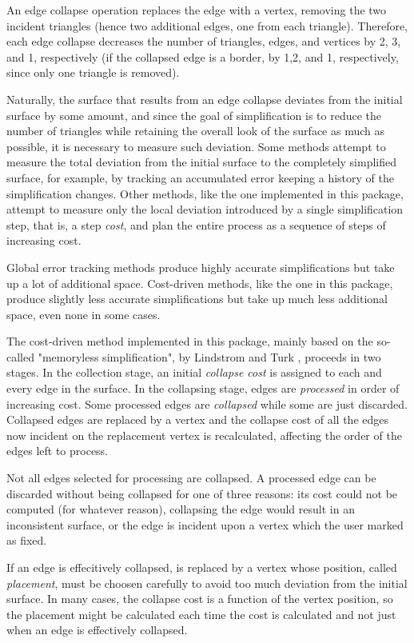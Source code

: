 An edge collapse operation replaces the edge with a vertex, removing the two incident triangles (hence two additional edges, one from each triangle). Therefore, each edge collapse decreases the number of triangles, edges, and vertices by 2, 3, and 1, respectively (if the collapsed edge is a border, by 1,2, and 1, respectively, since only one triangle is removed).

Naturally, the surface that results from an edge collapse deviates from the initial surface by some amount, and since the goal of simplification is to reduce the number of triangles while retaining the overall look of the surface as much as possible, it is necessary to measure such deviation. Some methods attempt to measure the total deviation from the initial surface to the completely simplified surface, for example, by tracking an accumulated error keeping a history of the simplification changes. Other methods, like the one implemented in this package, attempt to measure only the local deviation introduced by a single simplification step, that is, a step {\em cost}, and plan the entire process as a sequence of steps of increasing cost. 

Global error tracking methods produce highly accurate simplifications but take up a lot of additional space. Cost-driven methods, like the one in this package, produce slightly less accurate simplifications but take up much less additional space, even none in some cases.

The cost-driven method implemented in this package, mainly based on the so-called "memoryless simplification", by Lindstrom and Turk \cite{cgal:lt-fmeps-98,cgal:lt-ems-99}, proceeds in two stages. In the collection stage, an initial {\em collapse cost} is assigned to each and every edge in the surface. In the collapsing stage, edges are {\em processed} in order of increasing cost. Some processed edges are {\em collapsed} while some are just discarded. Collapsed edges are replaced by a vertex and the collapse cost of all the edges now incident on the replacement vertex is recalculated, affecting the order of the edges left to process.

Not all edges selected for processing are collapsed. A processed edge can be discarded without being collapsed for one of three reasons: its cost could not be computed (for whatever reason), collapsing the edge would result in an inconsistent surface, or the edge is incident upon a vertex which the user marked as fixed.

If an edge is effecitively collapsed, is replaced by a vertex whose position, called {\em placement}, must be choosen carefully to avoid too much deviation from the initial surface. In many cases, the collapse cost is a function of the vertex position, so the placement might be calculated each time the cost is calculated and not just when an edge is effectively collapsed.

